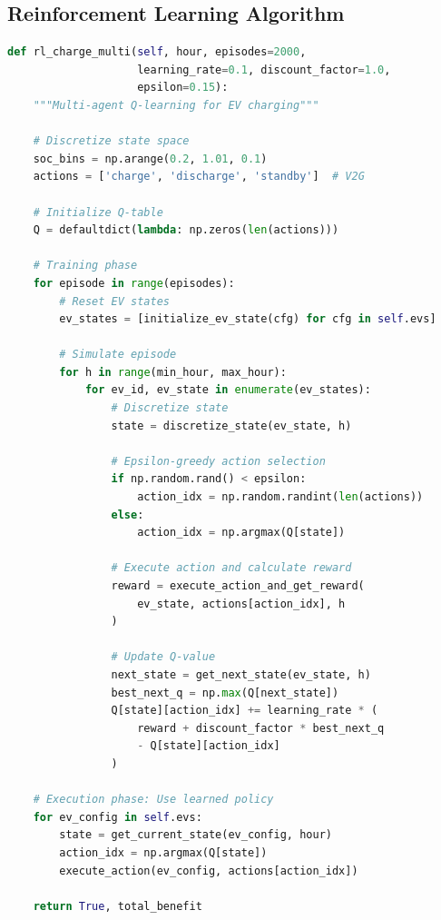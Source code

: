 \subsection{Reinforcement Learning Algorithm}

\begin{lstlisting}[language=Python,caption={Q-Learning algorithm (simplified)}]
def rl_charge_multi(self, hour, episodes=2000, 
                    learning_rate=0.1, discount_factor=1.0,
                    epsilon=0.15):
    """Multi-agent Q-learning for EV charging"""
    
    # Discretize state space
    soc_bins = np.arange(0.2, 1.01, 0.1)
    actions = ['charge', 'discharge', 'standby']  # V2G
    
    # Initialize Q-table
    Q = defaultdict(lambda: np.zeros(len(actions)))
    
    # Training phase
    for episode in range(episodes):
        # Reset EV states
        ev_states = [initialize_ev_state(cfg) for cfg in self.evs]
        
        # Simulate episode
        for h in range(min_hour, max_hour):
            for ev_id, ev_state in enumerate(ev_states):
                # Discretize state
                state = discretize_state(ev_state, h)
                
                # Epsilon-greedy action selection
                if np.random.rand() < epsilon:
                    action_idx = np.random.randint(len(actions))
                else:
                    action_idx = np.argmax(Q[state])
                
                # Execute action and calculate reward
                reward = execute_action_and_get_reward(
                    ev_state, actions[action_idx], h
                )
                
                # Update Q-value
                next_state = get_next_state(ev_state, h)
                best_next_q = np.max(Q[next_state])
                Q[state][action_idx] += learning_rate * (
                    reward + discount_factor * best_next_q 
                    - Q[state][action_idx]
                )
    
    # Execution phase: Use learned policy
    for ev_config in self.evs:
        state = get_current_state(ev_config, hour)
        action_idx = np.argmax(Q[state])
        execute_action(ev_config, actions[action_idx])
    
    return True, total_benefit
\end{lstlisting}

